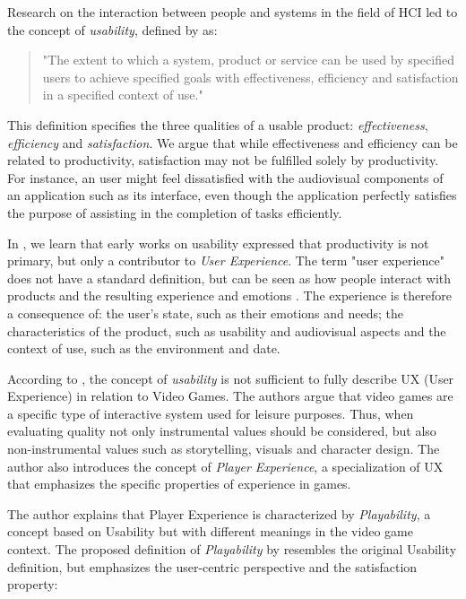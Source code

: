 Research on the interaction between people and systems in the field of HCI led to the concept of \emph{usability}, defined by \cite{ISO_ISO92411} as:

\begin{quotation}
"The extent to which a system, product or service can be used by specified users to achieve specified goals with effectiveness, efficiency and satisfaction in a specified context of use."
\end{quotation}

This definition specifies the three qualities of a usable product: \emph{effectiveness}, \emph{efficiency} and \emph{satisfaction}. We argue that while effectiveness and efficiency can be related to productivity,  satisfaction may not be fulfilled solely by productivity. For instance, an user might feel dissatisfied with the audiovisual components of an application such as its interface, even though the application perfectly satisfies the purpose of assisting in the completion of tasks efficiently.

In \citep{ARTICLE_UserExperienceAResearchAgenda}, we learn that early works on usability expressed that productivity is not primary, but only a contributor to \emph{User Experience}. The term "user experience" does not have a standard definition, but can be seen as how people interact with products and the resulting experience and emotions \cite{ARTICLE_UnderstandingExperience}. The experience is therefore a consequence of: the user's state, such as their emotions and needs; the characteristics of the product, such as usability and audiovisual aspects and the context of use, such as the environment and date.

According to \cite{ARTICLE_FromUsabilityToPlayability}, the concept of \emph{usability} is not sufficient to fully describe UX (User Experience) in relation to Video Games. The authors argue that video games are a specific type of interactive system used for leisure purposes. Thus, when evaluating quality not only instrumental values should be considered, but also non-instrumental values such as storytelling, visuals and character design. The author also introduces the concept of \emph{Player Experience}, a specialization of UX that emphasizes the specific properties of experience in games.

The author explains that Player Experience is characterized by \emph{Playability}, a concept based on Usability but with different meanings in the video game context. The proposed definition of \emph{Playability} by \cite{ARTICLE_FromUsabilityToPlayability} resembles the original Usability definition, but emphasizes the user-centric perspective and the satisfaction property:

